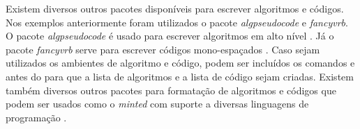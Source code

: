 Existem diversos outros pacotes disponíveis para escrever algoritmos e códigos. Nos exemplos anteriormente foram utilizados o pacote \textit{algpseudocode} e \textit{fancyvrb}. O pacote \textit{algpseudocode} é usado para escrever algoritmos em alto nível \cite{janos:2005:algpseudocode}. Já o pacote \textit{fancyvrb} serve para escrever códigos mono-espaçados \cite{zandt:2010:fancyvrb}.
Caso sejam utilizados os ambientes de algoritmo e código, podem ser incluídos os comandos  e  antes do  para que a lista de algoritmos e a lista de código sejam criadas.
Existem também diversos outros pacotes para formatação de algoritmos e códigos que podem ser usados como o \textit{minted} com suporte a diversas linguagens de programação \cite{poore:2016:minted}.
